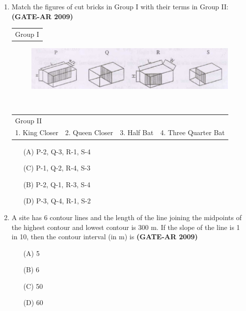 \documentclass[a4paper,10pt]{article}
\begin{document}
\begin{enumerate}
    \item Match the figures of cut bricks in Group I with their terms in Group II: \hfill \textbf{(GATE-AR 2009)} \\
    \begin{tabular}{ p }
	Group I \\
	\end{tabular}
	\begin{figure}[h!]
        \centering
        \includegraphics[width=0.5\linewidth]{figs/img_01.jpg}
        \label{fig:Img01}
	\end{figure} \\
	\begin{tabular}{ p p p p }
	Group II & & & \\
	1. King Closer & 2. Queen Closer & 3. Half Bat & 4. Three Quarter Bat \\
	\end{tabular}
	\begin{multicols}{2}
	\begin{itemize}
        \item[(A)] P-2, Q-3, R-1, S-4
        \item[(C)] P-1, Q-2, R-4, S-3
        \item[(B)] P-2, Q-1, R-3, S-4
        \item[(D)] P-3, Q-4, R-1, S-2
    \end{itemize}
	\end{multicols}

    \item A site has 6 contour lines and the length of the line joining the midpoints of the highest contour and lowest contour is 300 m. If the slope of the line is 1 in 10, then the contour interval (in m) is \hfill \textbf{(GATE-AR 2009)}
    \begin{multicols}{4}
	\begin{itemize}
        \item[(A)] 5
        \item[(B)] 6
        \item[(C)] 50
        \item[(D)] 60
    \end{itemize}
	\end{multicols}
	

\end{enumerate}
\end{document}
